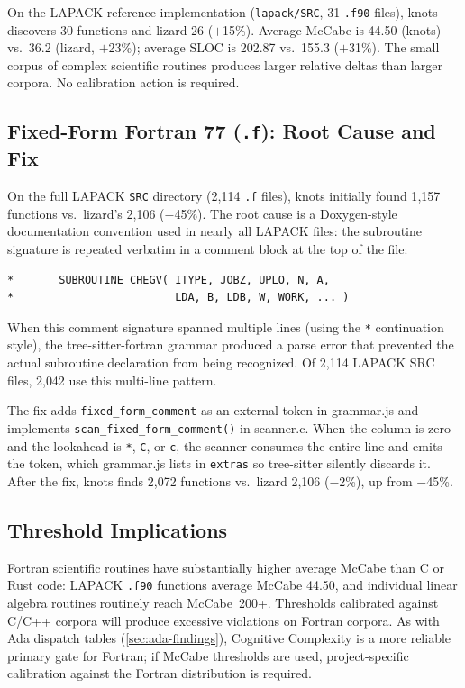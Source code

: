 \documentclass[10pt,twocolumn,letterpaper]{article}
\begin{document}
On the LAPACK reference implementation (\texttt{lapack/SRC}, 31
\texttt{.f90} files), knots discovers 30 functions and lizard 26
($+$15\%).  Average McCabe is 44.50 (knots) vs.\ 36.2 (lizard, $+$23\%);
average SLOC is 202.87 vs.\ 155.3 ($+$31\%).  The small corpus of
complex scientific routines produces larger relative deltas than
larger corpora.  No calibration action is required.

\subsection{Fixed-Form Fortran 77 (\texttt{.f}): Root Cause and Fix}

On the full LAPACK \texttt{SRC} directory (2{,}114 \texttt{.f} files),
knots initially found 1{,}157 functions vs.\ lizard's 2{,}106 ($-$45\%).
The root cause is a Doxygen-style documentation convention used in
nearly all LAPACK files: the subroutine signature is repeated verbatim
in a comment block at the top of the file:

\begin{verbatim}
*       SUBROUTINE CHEGV( ITYPE, JOBZ, UPLO, N, A,
*                         LDA, B, LDB, W, WORK, ... )
\end{verbatim}

When this comment signature spanned multiple lines (using the
\texttt{*} continuation style), the tree-sitter-fortran grammar
produced a parse error that prevented the actual subroutine declaration
from being recognized.  Of 2{,}114 LAPACK SRC files, 2{,}042 use
this multi-line pattern.

The fix adds \texttt{fixed\_form\_comment} as an external token in
grammar.js and implements \texttt{scan\_fixed\_form\_comment()} in
scanner.c.  When the column is zero and the lookahead is \texttt{*},
\texttt{C}, or \texttt{c}, the scanner consumes the entire line and
emits the token, which grammar.js lists in \texttt{extras} so
tree-sitter silently discards it.  After the fix, knots finds 2{,}072
functions vs.\ lizard 2{,}106 ($-$2\%), up from $-$45\%.

\subsection{Threshold Implications}

Fortran scientific routines have substantially higher average McCabe
than C or Rust code: LAPACK \texttt{.f90} functions average McCabe
44.50, and individual linear algebra routines routinely reach
McCabe~200+.  Thresholds calibrated against C/C++ corpora will produce
excessive violations on Fortran corpora.  As with Ada dispatch tables
(\cref{sec:ada-findings}), Cognitive Complexity is a more reliable
primary gate for Fortran; if McCabe thresholds are used, project-specific
calibration against the Fortran distribution is required.
\end{document}
